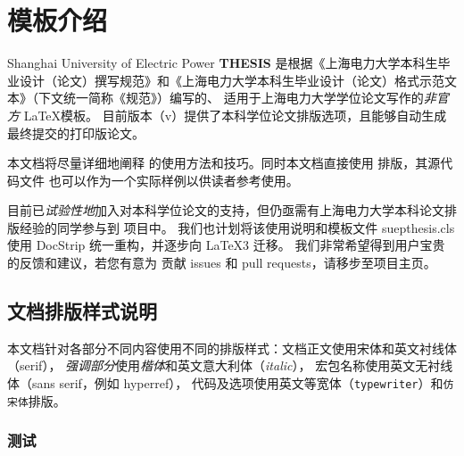 \chapter{模板介绍}
Shanghai University of Electric Power \textbf{THESIS}
是根据《上海电力大学本科生毕业设计（论文）撰写规范》和《上海电力大学本科生毕业设计（论文）格式示范文本》（下文统一简称《规范》）编写的、
适用于上海电力大学学位论文写作的\emph{非官方} \LaTeX 模板。
目前版本（v\version{}）提供了本科学位论文排版选项，且能够自动生成最终提交的打印版论文。

本文档将尽量详细地阐释  的使用方法和技巧。同时本文档直接使用  排版，其源代码文件 也可以作为一个实际样例以供读者参考使用。

目前已\emph{试验性地}加入对本科学位论文的支持，但仍亟需有上海电力大学本科论文排版经验的同学参与到 项目中。
我们也计划将该使用说明和模板文件 suepthesis.cls 使用 \textsf{DocStrip} 统一重构，并逐步向 \LaTeX3 迁移。
我们非常希望得到用户宝贵的反馈和建议，若您有意为 贡献 issues 和 pull requests，请移步至项目主页。

\section{文档排版样式说明}
本文档针对各部分不同内容使用不同的排版样式：文档正文使用宋体和英文衬线体（serif），
\emph{强调部分}使用\emph{楷体}和英文意大利体（\emph{italic}），
宏包名称使用英文无衬线体（\textsf{sans serif}，例如 \textsf{hyperref}），
代码及选项使用英文等宽体（\texttt{typewriter}）和\texttt{仿宋体}排版。

\subsection{测试}